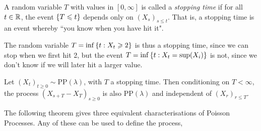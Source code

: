 \documentclass{article}
\begin{document}
\begin{definition}
    A random variable $T$ with values in $[0, \infty]$ is called a \textit{stopping time} if for all $t \in \mathbb{R}$, the event $\left\lbrace T \leqslant t \right\rbrace$ depends only on $(X_s)_{s \leq t}$. That is, a stopping time is an event whereby ``you know when you have hit it".
    
    The random variable $T = \inf \left\lbrace t: X_t \geqslant 2 \right\rbrace $ is thus a stopping time, since we can stop when we first hit 2, but the event $T = \inf \left\lbrace t:X_t = \sup (X_i) \right\rbrace$ is not, since we don't know if we will later hit a larger value.
\end{definition}

\begin{theorem}
    Let $(X_t)_{t \geq 0} \sim \mathrm{PP}(\lambda)$, with $T$ a stopping time. Then conditioning on $T < \infty$, the process $(X_{s+T} - X_T)_{s \geq 0}$ is also $\mathrm{PP}(\lambda)$ and independent of $(X_r)_{r \leq T}$.
    
\end{theorem}

The following theorem gives three equivalent characterisations of Poisson Processes. Any of these can be used to define the process,
\end{document}
